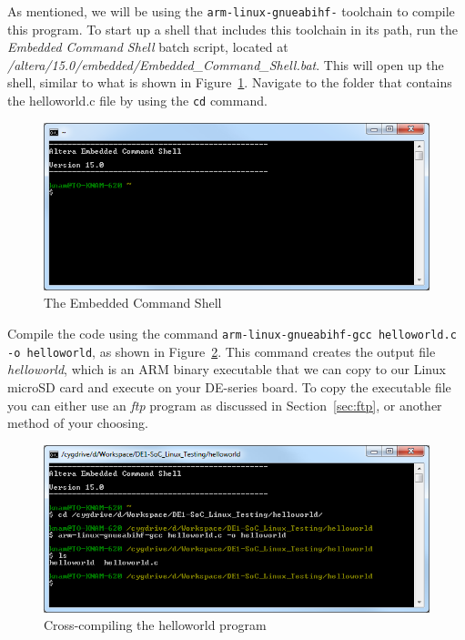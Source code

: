 \documentclass[11pt, twoside, pdftex]{article}
\begin{document}
As mentioned, we will be using the \texttt{arm-linux-gnueabihf-} toolchain to compile this 
program.  To start up a shell that includes this toolchain in its path, run the 
\textit{Embedded Command Shell} batch script, located at 
\textit{/altera\-/15.0/embed\-ded/Em\-bedded\_Comm\-and\_Sh\-ell.bat}. This will open up
the shell, similar to what is shown in Figure~\ref{fig:embedded_shell_1}. Navigate to the
folder that contains the helloworld.c file by using the \texttt{cd} command.

\begin{figure}[H]
   \begin{center}
       \includegraphics[scale=0.7]{figures/embedded_shell_1}
   \end{center}
	\vspace{-0.5cm}\caption{The Embedded Command Shell}
	\label{fig:embedded_shell_1}
\end{figure}

Compile the code using the command 
\texttt{arm-linux-gnueabihf-gcc helloworld.c -o helloworld}, as shown in 
Figure~\ref{fig:embedded_shell_2}. This command creates the output file \textit{helloworld}, which 
is an ARM binary executable that we can copy to our Linux microSD card and execute 
on your DE-series board. To copy the executable file you can either use an {\it ftp} program as
discussed in Section~\ref{sec:ftp}, or another method of your choosing.

\begin{figure}[H]
   \begin{center}
       \includegraphics[scale=0.7]{figures/embedded_shell_2}
   \end{center}
   \caption{Cross-compiling the helloworld program}
	\label{fig:embedded_shell_2}
\end{figure}
\end{document}

